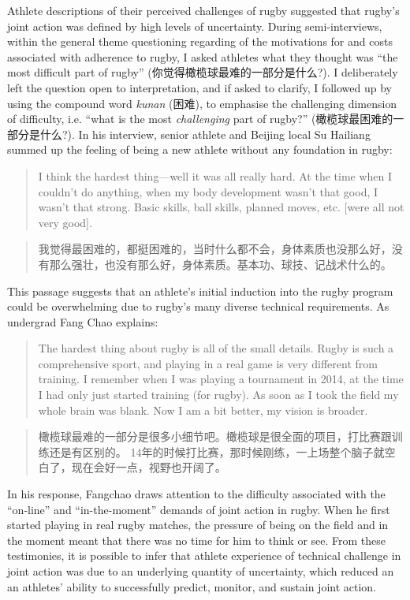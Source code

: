 \begin{CJK}{UTF8}{gbsn}
Athlete descriptions of their perceived challenges of rugby suggested that rugby's joint action was defined by high levels of uncertainty.
During semi-interviews, within the general theme questioning regarding of the motivations for and costs associated with adherence to rugby, I asked athletes what they thought was ``the most difficult part of rugby'' (你觉得橄榄球最难的一部分是什么?).  I deliberately left the question open to interpretation, and if asked to clarify, I followed up by using the compound word \textit{kunan} (困难), to emphasise the challenging dimension of difficulty, i.e. ``what is the most \textit{challenging} part of rugby?'' (橄榄球最困难的一部分是什么?).  In his interview, senior athlete and Beijing local Su Hailiang summed up the feeling of being a new athlete without any foundation in rugby:

      \begin{quote}
          I think the hardest thing---well it was all really hard.  At the time when I couldn't do anything, when my body development wasn't that good, I wasn't that strong.  Basic skills, ball skills, planned moves, etc. [were all not very good].
      \end{quote}
      \begin{quote}
          我觉得最困难的，都挺困难的，当时什么都不会，身体素质也没那么好，没有那么强壮，也没有那么好，身体素质。基本功、球技、记战术什么的。
      \end{quote}

This passage suggests that an athlete's initial induction into the rugby program could be overwhelming due to rugby's many diverse technical requirements.  As undergrad Fang Chao explains:
          \begin{quote}
          The hardest thing about rugby is all of the small details. Rugby is such a comprehensive sport, and playing in a real game is very different from training. I remember when I was playing a tournament in 2014, at the time I had only just started training (for rugby).  As soon as I took the field my whole brain was blank.  Now I am a bit better, my vision is broader.
          \end{quote}

          \begin{quote}
          橄榄球最难的一部分是很多小细节吧。橄榄球是很全面的项目，打比赛跟训练还是有区别的。 14年的时候打比赛，那时候刚练，一上场整个脑子就空白了，现在会好一点，视野也开阔了。
          \end{quote}
In his response, Fangchao draws attention to the difficulty associated with the ``on-line'' and ``in-the-moment'' demands of joint action in rugby.  When he first started playing in real rugby matches, the pressure of being on the field and in the moment meant that there was no time for him to think or see.  From these testimonies, it is possible to infer that athlete experience of technical challenge in joint action was due to an underlying quantity of uncertainty, which reduced an an athletes' ability to successfully predict, monitor, and sustain joint action.



\end{CJK}
